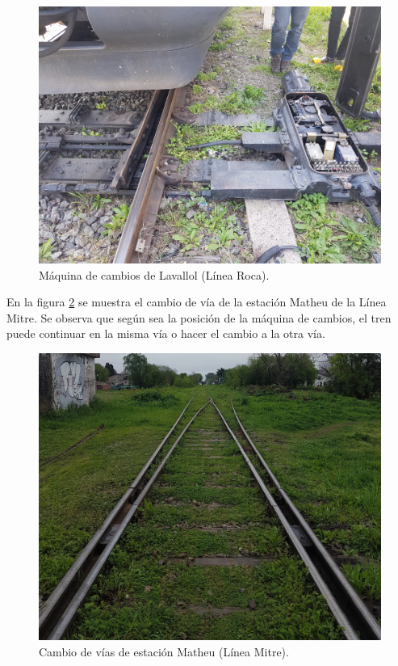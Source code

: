 			\begin{figure}[h!]
				\centering
				\includegraphics[scale=.06]{./Figures/Cambio}
				\caption{Máquina de cambios de Lavallol (Línea Roca).}
				\label{fig:Cambio}
			\end{figure} 
			
			\vspace{7cm}
			
			En la figura \ref{fig:Cambios_2} se muestra el cambio de vía de la estación Matheu de la Línea Mitre. Se observa que según sea la posición de la máquina de cambios, el tren puede continuar en la misma vía o hacer el cambio a la otra vía.
			
			\begin{figure}[h!]
				\centering
				\includegraphics[scale=.1]{./Figures/Cambios_2}
				\caption{Cambio de vías de estación Matheu (Línea Mitre).}
				\label{fig:Cambios_2}
			\end{figure} 
		
